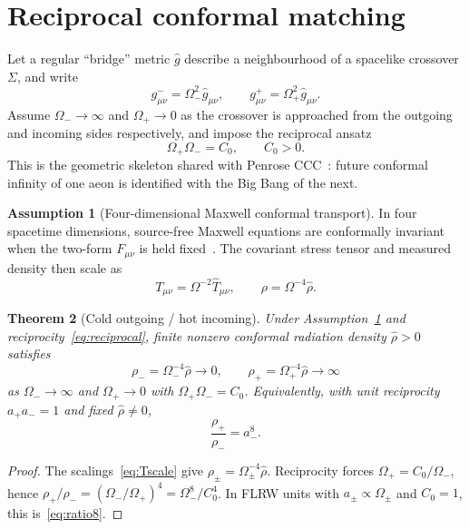 \documentclass[11pt]{article}
\newtheorem{theorem}{Theorem}[section]
\theoremstyle{definition}
\newtheorem{assumption}[theorem]{Assumption}
\theoremstyle{remark}
\begin{document}
\section{Reciprocal conformal matching}
\label{sec:conformal}
Let a regular ``bridge'' metric $\hat g$ describe a neighbourhood of a spacelike crossover
$\Sigma$, and write
\begin{equation}
\label{eq:conf}
g^-_{\mu\nu}=\Omega_-^2\hat g_{\mu\nu},
\qquad
g^+_{\mu\nu}=\Omega_+^2\hat g_{\mu\nu}.
\end{equation}
Assume $\Omega_-\to\infty$ and $\Omega_+\to0$ as the crossover is approached from the outgoing
and incoming sides respectively, and impose the reciprocal ansatz
\begin{equation}
\label{eq:reciprocal}
\Omega_+\Omega_-=C_0,
\qquad C_0>0.
\end{equation}
This is the geometric skeleton shared with Penrose CCC~\cite{Penrose2006,Penrose2010,Tod2003}:
future conformal infinity of one aeon is identified with the Big Bang of the next.

\begin{assumption}[Four-dimensional Maxwell conformal transport]
\label{ass:maxwell}
In four spacetime dimensions, source-free Maxwell equations are conformally invariant when the
two-form $F_{\mu\nu}$ is held fixed~\cite{Wald1984}.
The covariant stress tensor and measured density then scale as
\begin{equation}
\label{eq:Tscale}
T_{\mu\nu}=\Omega^{-2}\hat T_{\mu\nu},
\qquad
\rho=\Omega^{-4}\hat\rho.
\end{equation}
\end{assumption}

\begin{theorem}[Cold outgoing / hot incoming]
\label{thm:hot-cold}
Under Assumption~\ref{ass:maxwell} and reciprocity~\eqref{eq:reciprocal}, finite nonzero
conformal radiation density $\hat\rho>0$ satisfies
\begin{equation}
\label{eq:hotcold}
\rho_-=\Omega_-^{-4}\hat\rho\to0,
\qquad
\rho_+=\Omega_+^{-4}\hat\rho\to\infty
\end{equation}
as $\Omega_-\to\infty$ and $\Omega_+\to0$ with $\Omega_+\Omega_-=C_0$.
Equivalently, with unit reciprocity $a_+a_-=1$ and fixed $\hat\rho\neq0$,
\begin{equation}
\label{eq:ratio8}
\frac{\rho_+}{\rho_-}=a_-^{8}.
\end{equation}
\end{theorem}

\begin{proof}
The scalings~\eqref{eq:Tscale} give $\rho_\pm=\Omega_\pm^{-4}\hat\rho$.
Reciprocity forces $\Omega_+=C_0/\Omega_-$, hence
$\rho_+/\rho_-=(\Omega_-/\Omega_+)^4=\Omega_-^{8}/C_0^{4}$.
In FLRW units with $a_\pm\propto\Omega_\pm$ and $C_0=1$, this is~\eqref{eq:ratio8}.
\end{proof}
\end{document}
